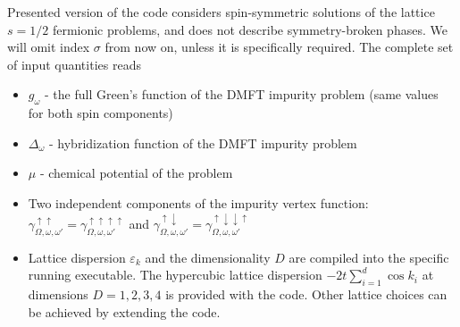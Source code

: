 \documentclass[3p,times,procedia]{elsarticle}
\begin{document}
Presented version of the code considers spin-symmetric solutions of the lattice $s=1/2$ fermionic problems, and does not describe symmetry-broken phases. We will omit index $\sigma$ from now on, unless it is specifically required. The complete set of input quantities reads
\begin{itemize}
\item $g_\omega$ - the full Green's function of the DMFT impurity problem (same values for both spin components)
\item $\Delta_{\omega}$ - hybridization function of the DMFT impurity problem
\item $\mu$ - chemical potential of the problem
\item Two independent components of the impurity vertex function: $\gamma^{\uparrow\uparrow}_{\Omega,\omega,\omega'} = \gamma_{\Omega,\omega,\omega'}^{\uparrow\uparrow\uparrow\uparrow}$ and $\gamma^{\uparrow\downarrow}_{\Omega,\omega,\omega'} = \gamma_{\Omega,\omega,\omega'}^{\uparrow\downarrow\downarrow\uparrow}$
\item Lattice dispersion $\varepsilon_{k}$ and the dimensionality $D$ are compiled into the specific running executable. The hypercubic lattice dispersion $-2t \sum_{i=1}^d \cos k_i$ at dimensions $D=1,2,3,4$ is provided with the code. Other lattice choices can be achieved by extending the code. 
\end{itemize}
\end{document}

